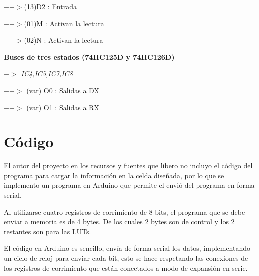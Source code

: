 \documentclass[12pt]{article}
\begin{document}
	$-->$(13)D2	:	Entrada
	
	$-->$(01)M	:	Activan la lectura
	
	$-->$(02)N	:	Activan la lectura

\textbf{Buses de tres estados (74HC125D y 74HC126D)}

\textit{$->$	IC4,IC5,IC7,IC8}

	$-->$	(var)	O0	:	Salidas a DX
	
	$-->$	(var)	O1	:	Salidas a RX
	
\pagebreak

\section{Código}

El autor del proyecto en los recursos y fuentes que libero no incluyo el código del programa para cargar la información en la celda diseñada, por lo que se implemento un programa en Arduino que permite el envió del programa en forma serial. 
 
Al utilizarse cuatro registros de corrimiento de 8 bits, el programa que se debe enviar a memoria es de 4 bytes. De los cuales 2 bytes son de control y los 2 restantes son para las LUTs. 
 
El código en Arduino es sencillo, envía de forma serial los datos, implementando un ciclo de reloj para enviar cada bit, esto se hace respetando las conexiones de los registros de corrimiento que están conectados a modo de expansión en serie.
\end{document}
